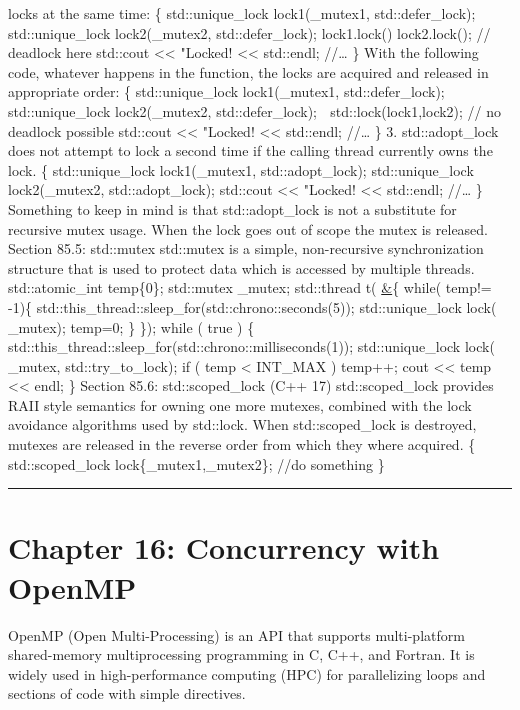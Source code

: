 locks at the same time: \{ std::unique\_lock lock1(\_mutex1,
std::defer\_lock); std::unique\_lock lock2(\_mutex2, std::defer\_lock);
lock1.lock() lock2.lock(); // deadlock here std::cout
\textless\textless{} "Locked! \textless\textless{} std::endl; //\ldots{}
\} With the following code, whatever happens in the function, the locks
are acquired and released in appropriate order: \{ std::unique\_lock
lock1(\_mutex1, std::defer\_lock); std::unique\_lock lock2(\_mutex2,
std::defer\_lock);  std::lock(lock1,lock2); // no deadlock possible
std::cout \textless\textless{} "Locked! \textless\textless{} std::endl;
//\ldots{} \} 3. std::adopt\_lock does not attempt to lock a second time
if the calling thread currently owns the lock. \{ std::unique\_lock
lock1(\_mutex1, std::adopt\_lock); std::unique\_lock lock2(\_mutex2,
std::adopt\_lock); std::cout \textless\textless{} "Locked!
\textless\textless{} std::endl; //\ldots{} \} Something to keep in mind
is that std::adopt\_lock is not a substitute for recursive mutex usage.
When the lock goes out of scope the mutex is released. Section 85.5:
std::mutex std::mutex is a simple, non-recursive synchronization
structure that is used to protect data which is accessed by multiple
threads. std::atomic\_int temp\{0\}; std::mutex \_mutex; std::thread t(
\href{}{\&}\{ while( temp!= -1)\{
std::this\_thread::sleep\_for(std::chrono::seconds(5));
std::unique\_lock lock( \_mutex); temp=0; \} \}); while ( true ) \{
std::this\_thread::sleep\_for(std::chrono::milliseconds(1));
std::unique\_lock lock( \_mutex, std::try\_to\_lock); if ( temp
\textless{} INT\_MAX ) temp++; cout \textless\textless{} temp
\textless\textless{} endl; \} Section 85.6: std::scoped\_lock (C++ 17)
std::scoped\_lock provides RAII style semantics for owning one more
mutexes, combined with the lock avoidance algorithms used by std::lock.
When std::scoped\_lock is destroyed, mutexes are released in the reverse
order from which they where acquired. \{ std::scoped\_lock
lock\{\_mutex1,\_mutex2\}; //do something \}

\begin{center}\rule{0.5\linewidth}{0.5pt}\end{center}

\hypertarget{chapter-16-concurrency-with-openmp}{%
\chapter{Chapter 16: Concurrency with
OpenMP}\label{chapter-16-concurrency-with-openmp}}

OpenMP (Open Multi-Processing) is an API that supports multi-platform
shared-memory multiprocessing programming in C, C++, and Fortran. It is
widely used in high-performance computing (HPC) for parallelizing loops
and sections of code with simple directives.

